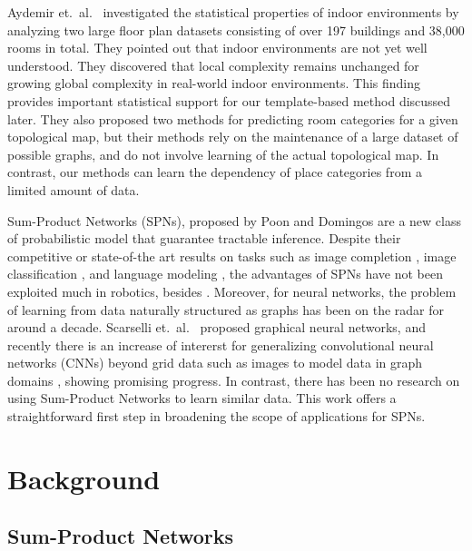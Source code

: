 \documentclass[10pt, titlepage]{article}
\theoremstyle{definition}
\begin{document}
Aydemir et.~al.~\cite{aydemir2012can} investigated the statistical properties of indoor environments by analyzing two large floor plan datasets consisting of over 197 buildings and 38,000 rooms in total. They pointed out that indoor environments are not yet well understood. They discovered that local complexity remains unchanged for growing global complexity in real-world indoor environments. This finding provides important statistical support for our template-based method discussed later. They also proposed two methods for predicting room categories for a given topological map, but their methods rely on the maintenance of a large dataset of possible graphs, and do not involve learning of the actual topological map. In contrast, our methods can learn the dependency of place categories from a limited amount of data.


Sum-Product Networks (SPNs), proposed by Poon and Domingos \cite{poon2011sum} are a new class of probabilistic model that guarantee tractable inference. Despite their competitive or state-of-the art results on tasks such as image completion \cite{poon2011sum}, image classification \cite{gens2012discriminative}, and language modeling \cite{cheng2014language}, the advantages of SPNs have not been exploited much in robotics, besides \cite{pronobis2016learning}. Moreover, for neural networks, the problem of learning from data naturally structured as graphs has been on the radar for around a decade. Scarselli et.~al.~\cite{scarselli2009graph} proposed graphical neural networks, and recently there is an increase of intererst for generalizing convolutional neural networks (CNNs) beyond grid data such as images to model data in graph domains \cite{defferrard2016convolutional}\cite{kipf2016semi}, showing promising progress. In contrast, there has been no research on using Sum-Product Networks to learn similar data. This work offers a straightforward first step in broadening the scope of applications for SPNs.




\section{Background}\label{section:background}

\subsection{Sum-Product Networks}\label{section:spn}
\end{document}
